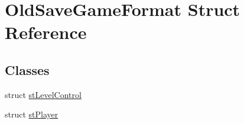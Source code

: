\hypertarget{struct_old_save_game_format}{
\section{OldSaveGameFormat Struct Reference}
\label{struct_old_save_game_format}
}
\subsection*{Classes}
\begin{DoxyCompactItemize}
\item 
struct \hyperlink{struct_old_save_game_format_1_1st_level_control}{stLevelControl}
\item 
struct \hyperlink{struct_old_save_game_format_1_1st_player}{stPlayer}
\end{DoxyCompactItemize}
